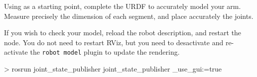 \documentclass{instructions}
\begin{document}
Using  as a starting point, complete the URDF to accurately
model your arm. Measure precisely the dimension of each segment, and place
accurately the joints.

If you wish to check your model, reload the robot description, and restart the
 node. You do not need to restart RViz, but you need
to desactivate and re-activate the \texttt{robot model} plugin to update the
rendering.


\begin{shcode}
> rosrun joint_state_publisher joint_state_publisher _use_gui:=true
\end{shcode}


\end{document}
